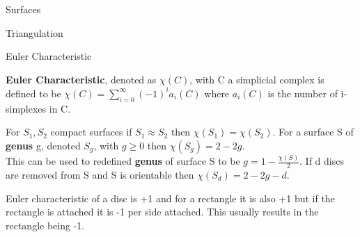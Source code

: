 \documentclass[12pt, letterpaper]{article}
\begin{document}
\begin{section}{Surfaces}
\begin{subsection}{Triangulation}
  \end{subsection}

  \begin{subsection}{Euler Characteristic}

    \textbf{Euler Characteristic}, denoted as \(\chi(C)\), with C a simplicial
    complex is defined to be \(\chi(C) = \sum_{i = 0}^{\infty} (-1)^{i}a_{i}(C)\)
    where \(a_{i}(C)\) is the number of i-simplexes in C.

    For \(S_{1}, S_{2}\) compact surfaces if \(S_{1} \approx S_{2}\) then
    \(\chi(S_{1}) = \chi(S_{2})\).
    For a surface S of \textbf{genus} g, denoted \(S_{g}\), with \(g \geq 0\)
    then \(\chi(S_{g}) = 2 - 2g\). \\
    This can be used to redefined \textbf{genus} of surface S to be
    \(g = 1 - \frac{\chi(S)}{2}\). If d discs are removed from S and S is
    orientable then \(\chi(S_{d}) = 2 - 2g -d\).

    Euler characteristic of a disc is +1 and for a rectangle it is also +1
    but if the rectangle is attached it is -1 per side attached. This usually
    results in the rectangle being -1.

  \end{subsection}

\end{section}
\end{document}

